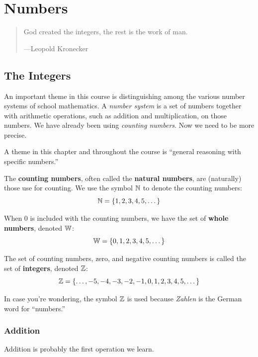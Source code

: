 \chapter{Numbers}

\begin{quote}
God created the integers, the rest is the work of man.

\hfill---Leopold Kronecker 
\end{quote}

\section{The Integers}
An important theme in this course is distinguishing among the various number systems of school mathematics.  A \emph{number system} is a set of numbers together with arithmetic operations, such as addition and multiplication, on those numbers.  We have already been using \textit{counting numbers}.  Now we need to be more precise.  

\begin{teachingnote}
A theme in this chapter and throughout the course is ``general reasoning with specific numbers.''
\end{teachingnote}

\begin{definition}
The \textbf{counting numbers}, often called the \textbf{natural numbers}, are (naturally) those use for counting.  We use the symbol $\mathbb N$ to denote the counting numbers:  
\[
\mathbb N = \{1, 2, 3, 4, 5, \dots\}
\]

When $0$ is included with the counting numbers, we have the set of \textbf{whole numbers}, denoted $\mathbb W$:  
\[
\mathbb W = \{0, 1, 2, 3, 4, 5, \dots\}
\]

The set of counting numbers, zero, and negative counting numbers is called
the set of \textbf{integers}, denoted $\mathbb Z$:
\[
\mathbb Z = \{\dots, -5,-4,-3,-2,-1,0,1,2,3,4,5,\dots \}
\]
\end{definition}

In case you're wondering, the symbol $\mathbb Z$ is used because
\textit{Zahlen} is the German word for ``numbers.'' 

\subsection{Addition}

Addition is probably the first operation we learn.    

